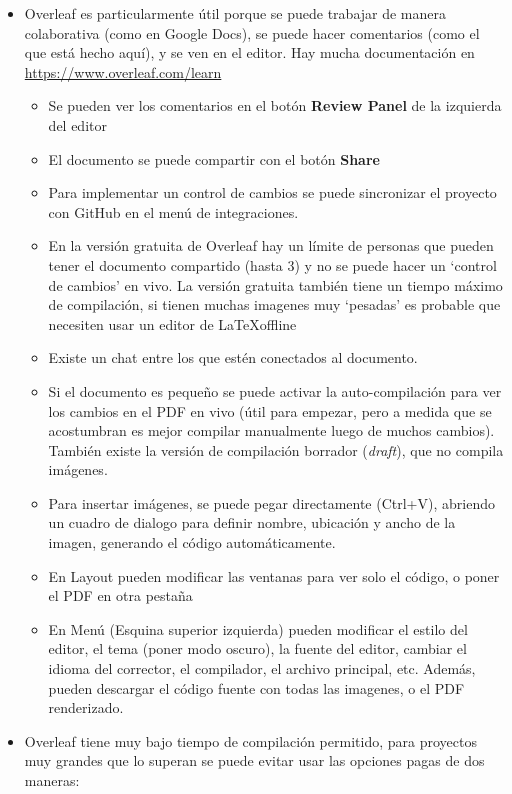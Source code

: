 \begin{itemize}
    \item Overleaf es particularmente útil porque se puede trabajar de manera colaborativa (como en Google Docs), se puede hacer comentarios (como el que está hecho aquí), y se ven en el editor. Hay mucha documentación en \url{https://www.overleaf.com/learn}
    \begin{itemize}
        \item Se pueden ver los comentarios en el botón \textbf{Review Panel} de la izquierda del editor
        \item El documento se puede compartir con el botón \textbf{Share}
        \item Para implementar un control de cambios se puede sincronizar el proyecto con GitHub en el menú de integraciones.
        \item En la versión gratuita de Overleaf hay un límite de personas que pueden tener el documento compartido (hasta 3) y no se puede hacer un `control de cambios' en vivo. La versión gratuita también tiene un tiempo máximo de compilación, si tienen muchas imagenes muy `pesadas' es probable que necesiten usar un editor de \LaTeX offline
        \item Existe un chat entre los que estén conectados al documento. 
        \item Si el documento es pequeño se puede activar la auto-compilación para ver los cambios en el PDF en vivo (útil para empezar, pero a medida que se acostumbran es mejor compilar manualmente luego de muchos cambios). También existe la versión de compilación borrador (\textit{draft}), que no compila imágenes.
        \item Para insertar imágenes, se puede pegar directamente (Ctrl+V), abriendo un cuadro de dialogo para definir nombre, ubicación y ancho de la imagen, generando el código automáticamente.
        \item En Layout pueden modificar las ventanas para ver solo el código, o poner el PDF en otra pestaña
        \item En Menú (Esquina superior izquierda) pueden modificar el estilo del editor, el tema (poner modo oscuro), la fuente del editor, cambiar el idioma del corrector, el compilador, el archivo principal, etc. Además, pueden descargar el código fuente con todas las imagenes, o el PDF renderizado.
    \end{itemize}
    \item Overleaf tiene muy bajo tiempo de compilación permitido, para proyectos muy grandes que lo superan se puede evitar usar las opciones pagas de dos maneras:

\end{itemize}
